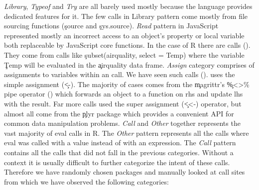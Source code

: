 \documentclass[conference]{IEEEtran}
\begin{document}
\noindent \emph{Library}, \emph{Typeof} and \emph{Try} are all barely used
mostly because the language provides dedicated features for it. The few calls in
Library pattern come mostly from file sourcing functions (\ie \c{source} and \c{sys.source}).
%
\noindent \emph{Read} pattern in JavaScript represented mostly an incorrect
access to an object's property or local variable both replaceable by JavaScript
core functions. In the case of R there are \PatternReadRnd \eval calls
(\PatternReadRatio). They come from calls like \c{subset(airquality, select =
  Temp)} where the variable \c{Temp} will be evaluated in the \c{airquality}
data frame.
%
\noindent \emph{Assign} category comprises of assignments to variables within
an \eval call. We have seen \PatternAssignRnd such calls (\PatternAssignRatio).
\PatternAssignArrowRatio uses the simple assignment (\c{<-}). The majority of
cases comes from the \c{magrittr}'s \c{\%<>\%} pipe operator
(\PatternAssignArrowMagrittrRatio) which forwards an object to a function on rhs
and update lhs with the result. Far more calls used the super assignment
(\c{<<-}) operator, but almost all come from the \c{plyr} package which provides
a convenient API for common data manipulation problems.
%
\noindent \emph{Call} and \emph{Other} together represents the vast majority of
eval calls in R. The \emph{Other} pattern represents all the calls where eval
was called with a value instead of with an expression. The \emph{Call} pattern
contains all the calls that did not fall in the previous categories. Without a
context it is usually difficult to further categorize the intent of these calls.
Therefore we have randomly chosen \PatternManualPackages packages and manually
looked at \PatternManualCallsites call sites from which we have observed the following categories:

\end{document}
